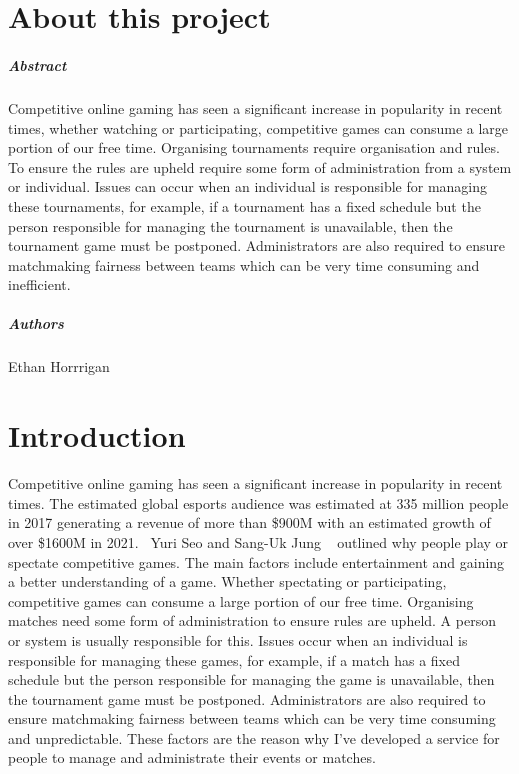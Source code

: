 
\chapter*{About this project}
\paragraph{Abstract}
Competitive online gaming has seen a significant increase in popularity in recent times, whether watching or participating, competitive games can consume a large portion of our free time. Organising tournaments require organisation and rules. To ensure the rules are upheld require some form of administration from a system or individual. Issues can occur when an individual is responsible for managing these tournaments, for example, if a tournament has a fixed schedule but the person responsible for managing the tournament is unavailable, then the tournament game must be postponed. Administrators are also required to ensure matchmaking fairness between teams which can be very time consuming and inefficient.

\paragraph{Authors}
Ethan Horrrigan



\chapter{Introduction}
Competitive online gaming has seen a significant increase in popularity in recent times. The estimated global esports audience was estimated at 335 million people in 2017 generating a revenue of more than \$900M with an estimated growth of over \$1600M in 2021.~\cite{sjoblom2019esports} Yuri Seo and Sang-Uk Jung ~\cite{seo2016beyond} outlined why people play or spectate competitive games. The main factors include entertainment and gaining a better understanding of a game. Whether spectating or participating, competitive games can consume a large portion of our free time. Organising matches need some form of administration to ensure rules are upheld. A person or system is usually responsible for this. Issues occur when an individual is responsible for managing these games, for example, if a match has a fixed schedule but the person responsible for managing the game is unavailable, then the tournament game must be postponed. Administrators are also required to ensure matchmaking fairness between teams which can be very time consuming and unpredictable. These factors are the reason why I've developed a service for people to manage and administrate their events or matches.


